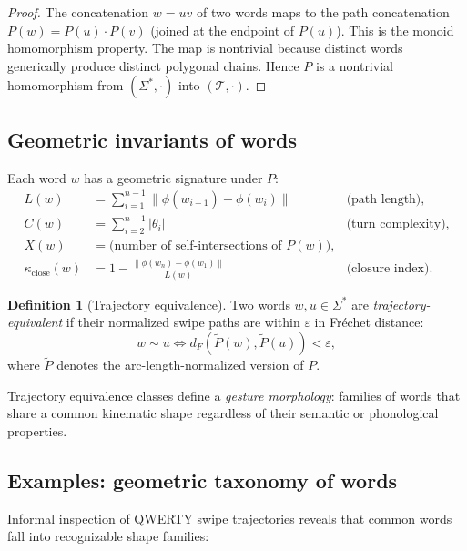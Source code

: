 \documentclass[12pt,a4paper]{article}
\theoremstyle{plain}
\theoremstyle{definition}
\newtheorem{definition}[theorem]{Definition}
\begin{document}
\begin{proof}
The concatenation $w = uv$ of two words maps to the path concatenation
$P(w) = P(u) \cdot P(v)$ (joined at the endpoint of $P(u)$). This is the
monoid homomorphism property. The map is nontrivial because distinct words
generically produce distinct polygonal chains. Hence $P$ is a nontrivial
homomorphism from $(\Sigma^*,\cdot)$ into $(\mathcal{T}, \cdot)$.
\end{proof}

\subsection{Geometric invariants of words}

Each word $w$ has a geometric signature under $P$:
\begin{align*}
L(w) &= \sum_{i=1}^{n-1}\|\phi(w_{i+1})-\phi(w_i)\|
  &\text{(path length)},\\
C(w) &= \sum_{i=2}^{n-1}|\theta_i|
  &\text{(turn complexity)},\\
X(w) &= \text{(number of self-intersections of }P(w)\text{)},\\
\kappa_{\mathrm{close}}(w) &= 1 - \frac{\|\phi(w_n)-\phi(w_1)\|}{L(w)}
  &\text{(closure index)}.
\end{align*}

\begin{definition}[Trajectory equivalence]
Two words $w, u \in \Sigma^*$ are \emph{trajectory-equivalent} if their
normalized swipe paths are within $\varepsilon$ in Fréchet distance:
\[
w \sim u \iff d_F(\widetilde P(w), \widetilde P(u)) < \varepsilon,
\]
where $\widetilde P$ denotes the arc-length-normalized version of $P$.
\end{definition}

Trajectory equivalence classes define a \emph{gesture morphology}: families of
words that share a common kinematic shape regardless of their semantic or
phonological properties.

\subsection{Examples: geometric taxonomy of words}

Informal inspection of QWERTY swipe trajectories reveals that common words fall
into recognizable shape families:
\end{document}
